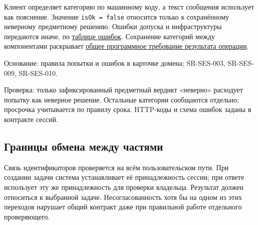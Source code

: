\documentclass[12pt,a4paper]{article}
\begin{document}
Клиент определяет категорию по машинному коду, а текст сообщения использует как пояснение. Значение \texttt{isOk\ =\ false} относится только к сохранённому неверному предметному решению. Ошибки допуска и инфраструктуры передаются иначе, по \href{../07_\%D0\%9F\%D1\%80\%D0\%BE\%D0\%B3\%D1\%80\%D0\%B0\%D0\%BC\%D0\%BC\%D0\%BD\%D1\%8B\%D0\%B5_\%D1\%82\%D1\%80\%D0\%B5\%D0\%B1\%D0\%BE\%D0\%B2\%D0\%B0\%D0\%BD\%D0\%B8\%D1\%8F/DOC-06.2_\%D0\%A1\%D0\%B5\%D1\%81\%D1\%81\%D0\%B8\%D0\%B8_\%D0\%B7\%D0\%B0\%D0\%B4\%D0\%B0\%D1\%87_\%D0\%B8_\%D0\%BF\%D0\%BB\%D0\%B0\%D0\%BD\%D0\%B8\%D1\%80\%D0\%BE\%D0\%B2\%D1\%89\%D0\%B8\%D0\%BA.pdf\#nameddest=\%D0\%BA\%D0\%BE\%D0\%B4\%D1\%8B-\%D0\%B8-\%D0\%BF\%D1\%80\%D0\%B5\%D0\%B4\%D1\%81\%D1\%82\%D0\%B0\%D0\%B2\%D0\%BB\%D0\%B5\%D0\%BD\%D0\%B8\%D0\%B5-\%D0\%BE\%D1\%88\%D0\%B8\%D0\%B1\%D0\%BE\%D0\%BA}{таблице ошибок}. Сохранение категорий между компонентами раскрывает \href{../07_\%D0\%9F\%D1\%80\%D0\%BE\%D0\%B3\%D1\%80\%D0\%B0\%D0\%BC\%D0\%BC\%D0\%BD\%D1\%8B\%D0\%B5_\%D1\%82\%D1\%80\%D0\%B5\%D0\%B1\%D0\%BE\%D0\%B2\%D0\%B0\%D0\%BD\%D0\%B8\%D1\%8F/DOC-06_\%D0\%9F\%D1\%80\%D0\%BE\%D0\%B3\%D1\%80\%D0\%B0\%D0\%BC\%D0\%BC\%D0\%BD\%D1\%8B\%D0\%B5_\%D1\%82\%D1\%80\%D0\%B5\%D0\%B1\%D0\%BE\%D0\%B2\%D0\%B0\%D0\%BD\%D0\%B8\%D1\%8F.pdf\#nameddest=swr-sys-007-\%D0\%BA\%D0\%B0\%D1\%82\%D0\%B5\%D0\%B3\%D0\%BE\%D1\%80\%D0\%B8\%D1\%8F-\%D1\%80\%D0\%B5\%D0\%B7\%D1\%83\%D0\%BB\%D1\%8C\%D1\%82\%D0\%B0\%D1\%82\%D0\%B0-\%D0\%BE\%D0\%BF\%D0\%B5\%D1\%80\%D0\%B0\%D1\%86\%D0\%B8\%D0\%B8}{общее программное требование результата операции}.

Основание: правила попытки и ошибок в карточке домена; SR-SES-003, SR-SES-009, SR-SES-010.

Проверка: только зафиксированный предметный вердикт «неверно» расходует попытку как неверное решение. Остальные категории сообщаются отдельно; просрочка учитывается по правилу срока. HTTP-коды и схема ошибок заданы в контракте сессий.

\subsection{Границы обмена между частями}\label{ux433ux440ux430ux43dux438ux446ux44b-ux43eux431ux43cux435ux43dux430-ux43cux435ux436ux434ux443-ux447ux430ux441ux442ux44fux43cux438}

\hypertarget{границы-обмена-между-частями}{}

Связь идентификаторов проверяется на всём пользовательском пути. При создании задачи система устанавливает её принадлежность сессии; при ответе использует эту же принадлежность для проверки владельца. Результат должен относиться к выбранной задаче. Несогласованность хотя бы на одном из этих переходов нарушает общий контракт даже при правильной работе отдельного проверяющего.
\end{document}
